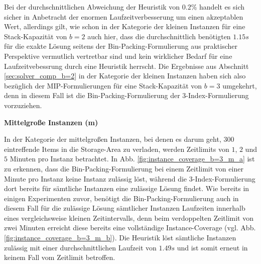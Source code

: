 Bei der durchschnittlichen Abweichung der Heuristik von $0.2 \%$ handelt es sich sicher in Anbetracht
der enormen Laufzeitverbesserung um einen akzeptablen Wert, allerdings gilt, wie schon in der Kategorie
der kleinen Instanzen für eine Stack-Kapazität von $b = 2$ auch hier, dass die durchschnittlich benötigten $1.15s$
für die exakte Lösung seitens der Bin-Packing-Formulierung aus praktischer Perspektive vermutlich vertretbar sind
und kein wirklicher Bedarf für eine Laufzeitvebessrung durch eine Heuristik herrscht.
Die Ergebnisse aus Abschnitt \ref{sec:solver_comp_b=2} in der Kategorie der kleinen
Instanzen haben sich also bezüglich der MIP-Formulierungen für eine Stack-Kapazität von $b = 3$ umgekehrt, denn in diesem Fall ist die Bin-Packing-Formulierung der 3-Index-Formulierung vorzuziehen.

\textbf{Mittelgroße Instanzen (m)}

In der Kategorie der mittelgroßen Instanzen, bei denen es darum geht, $300$ eintreffende Items in die Storage-Area
zu verladen, werden Zeitlimits von $1$, $2$ und $5$ Minuten pro Instanz betrachtet.
In Abb. \ref{fig:instance_coverage_b=3_m_a} ist zu erkennen, dass die Bin-Packing-Formulierung bei einem Zeitlimit von einer Minute pro Instanz keine Instanz zulässig löst, während die 3-Index-Formulierung dort bereits für sämtliche Instanzen eine zulässige Lösung findet. Wie bereits in einigen Experimenten zuvor, benötigt die Bin-Packing-Formulierung
auch in diesem Fall für die zulässige Lösung sämtlicher Instanzen Laufzeiten innerhalb eines vergleichsweise kleinen Zeitintervalls, denn beim verdoppelten Zeitlimit von zwei Minuten erreicht diese bereits eine vollständige Instance-Coverage (vgl. Abb. \ref{fig:instance_coverage_b=3_m_b}).
Die Heuristik löst sämtliche Instanzen zulässig mit einer durchschnittlichen Laufzeit von $1.49s$ und ist somit erneut
in keinem Fall vom Zeitlimit betroffen.

